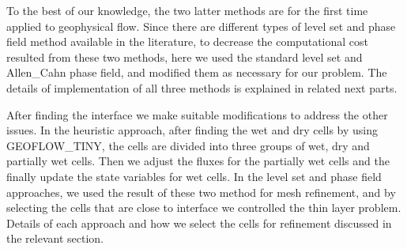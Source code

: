\documentclass[letterpaper,10pt]{article}
\begin{document}
 To the best of our knowledge, the two latter methods  are for the first time applied to geophysical flow. Since there are different types of level set and phase field method available in the literature, to decrease the computational cost resulted from these two methods, here we used the standard level set and Allen\_Cahn phase field, and modified them as necessary for our problem. The details of implementation of all three methods is explained in related next parts.

After finding the interface we make suitable modifications to address the other issues. In the heuristic approach, after finding the wet and dry cells by using GEOFLOW\_TINY, the cells are divided into three groups of wet, dry and partially wet cells. Then we  adjust the fluxes for the partially wet cells and the finally update the state variables for wet cells.
In the level set and phase field approaches, we used the result of these two method for mesh refinement, and by selecting the cells that are close to interface we controlled the thin layer problem. Details of each approach and how we select the cells for refinement discussed in the relevant section.
\end{document}
